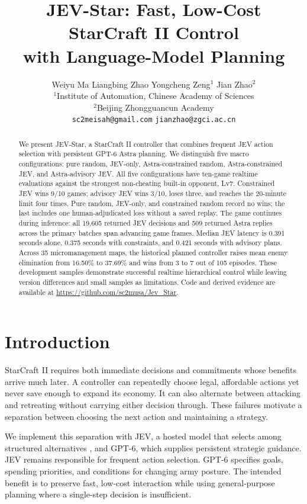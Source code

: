 \documentclass{article}
\title{JEV-Star: Fast, Low-Cost StarCraft II Control\\with Language-Model Planning}
\author{%
  Weiyu Ma \quad Liangbing Zhao \quad Yongcheng Zeng$^{1}$ \quad Jian Zhao$^{2}$\\
  $^{1}$Institute of Automation, Chinese Academy of Sciences\\
  $^{2}$Beijing Zhongguancun Academy\\
  \texttt{sc2meisah@gmail.com} \quad \texttt{jianzhao@zgci.ac.cn}
}
\begin{document}
\maketitle

\begin{abstract}
We present JEV-Star, a StarCraft II controller that combines frequent JEV action selection with persistent GPT-6 Astra planning. We distinguish five macro configurations: pure random, JEV-only, Astra-constrained random, Astra-constrained JEV, and Astra-advisory JEV. All five configurations have ten-game realtime evaluations against the strongest non-cheating built-in opponent, Lv7. Constrained JEV wins 9/10 games; advisory JEV wins 3/10, loses three, and reaches the 20-minute limit four times. Pure random, JEV-only, and constrained random record no wins; the last includes one human-adjudicated loss without a saved replay. The game continues during inference: all 19,605 returned JEV decisions and 509 returned Astra replies across the primary batches span advancing game frames. Median JEV latency is 0.391 seconds alone, 0.375 seconds with constraints, and 0.421 seconds with advisory plans. Across 35 micromanagement maps, the historical planned controller raises mean enemy elimination from 16.50\% to 37.69\% and wins from 3 to 7 out of 105 episodes. These development samples demonstrate successful realtime hierarchical control while leaving version differences and small samples as limitations. Code and derived evidence are available at \url{https://github.com/sc2musa/Jev_Star}.
\end{abstract}

\section{Introduction}

StarCraft II requires both immediate decisions and commitments whose benefits arrive much later. A controller can repeatedly choose legal, affordable actions yet never save enough to expand its economy. It can also alternate between attacking and retreating without carrying either decision through. These failures motivate a separation between choosing the next action and maintaining a strategy.

We implement this separation with JEV, a hosted model that selects among structured alternatives \citep{typesafe2026jev}, and GPT-6, which supplies persistent strategic guidance. JEV remains responsible for frequent action selection. GPT-6 specifies goals, spending priorities, and conditions for changing army posture. The intended benefit is to preserve fast, low-cost interaction while using general-purpose planning where a single-step decision is insufficient.
\end{document}
